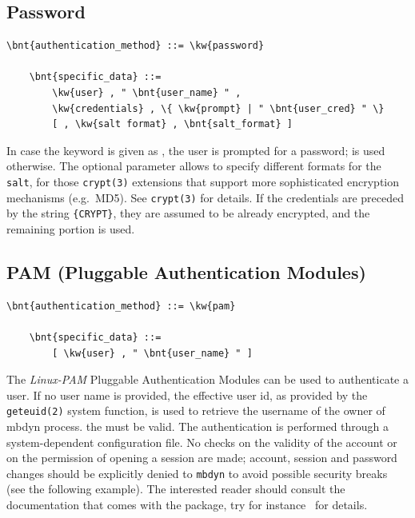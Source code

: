 \subsection{Password}
\begin{Verbatim}[commandchars=\\\{\}]
    \bnt{authentication_method} ::= \kw{password}

    \bnt{specific_data} ::=
        \kw{user} , " \bnt{user_name} " ,
        \kw{credentials} , \{ \kw{prompt} | " \bnt{user_cred} " \}
        [ , \kw{salt format} , \bnt{salt_format} ]
\end{Verbatim}
In case the keyword  is given as , the user is
prompted for a password;  is used otherwise.
The optional parameter  allows to specify different
formats for the \texttt{salt}, for those \texttt{crypt(3)} extensions 
that support more sophisticated encryption mechanisms (e.g.\ MD5).
See \texttt{crypt(3)} for details.
If the credentials are preceded by the string \texttt{\{CRYPT\}},
they are assumed to be already encrypted, and the remaining portion is used.

\subsection{PAM (Pluggable Authentication Modules)}
\begin{Verbatim}[commandchars=\\\{\}]
    \bnt{authentication_method} ::= \kw{pam}

    \bnt{specific_data} ::=
        [ \kw{user} , " \bnt{user_name} " ]
\end{Verbatim}
The {\em Linux-PAM} Pluggable Authentication Modules can be used to
authenticate a user. 
If no user name is provided, the effective user id, as provided by the 
\texttt{geteuid(2)} system function, is used to retrieve the username of the
owner of mbdyn process.
the  must be valid. 
The authentication is performed through a system-dependent 
configuration file.
No checks on the validity of the account or on the permission of opening a
session are made; account, session and password changes should be explicitly
denied to \texttt{mbdyn} to avoid possible security breaks (see the following
example).
The interested reader should consult the documentation that comes with the
package, try for instance
\
for details.

